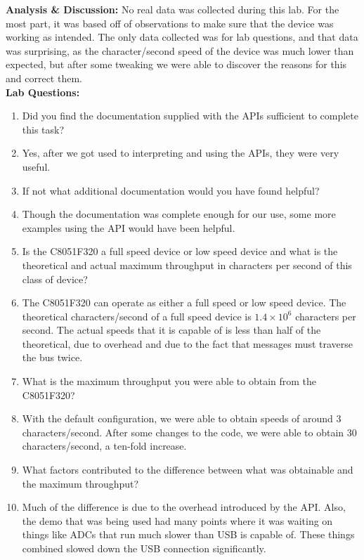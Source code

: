 \documentclass{article}
\newcommand{\Q}{\textbf{Q:}}
\newcommand{\A}{\textbf{A:}}
\newcommand{\sect}[1]{\noindent\textbf{#1}}
\begin{document}
\sect{Analysis \& Discussion:} No real data was collected during this lab. For the most part, it was based off of observations to make sure that the device was working as intended. The only data collected was for lab questions, and that data was surprising, as the character/second speed of the device was much lower than expected, but after some tweaking we were able to discover the reasons for this and correct them.\\

\sect{Lab Questions:}

\begin{enumerate}
	\item[\Q] Did you find the documentation supplied with the APIs sufficient to complete this task?
	\item[\A] Yes, after we got used to interpreting and using the APIs, they were very useful.
	\item[\Q]If not what additional documentation would you have found helpful?
	\item[\A] Though the documentation was complete enough for our use, some more examples using the API would have been helpful.
	\item[\Q] Is the C8051F320 a full speed device or low speed device and what is the theoretical and actual maximum throughput in characters per second of this class of device?
	\item[\A] The C8051F320 can operate as either a full speed or low speed device. The theoretical characters/second of a full speed device is $1.4\times 10^6$ characters per second. The actual speeds that it is capable of is less than half of the theoretical, due to overhead and due to the fact that messages must traverse the bus twice.
	\item[\Q] What is the maximum throughput you were able to obtain from the C8051F320?
	\item[\A] With the default configuration, we were able to obtain speeds of around 3 characters/second. After some changes to the code, we were able to obtain 30 characters/second, a ten-fold increase.
	\item[\Q] What factors contributed to the difference between what was obtainable and the maximum throughput?
	\item[\A] Much of the difference is due to the overhead introduced by the API. Also, the demo that was being used had many points where it was waiting on things like ADCs that run much slower than USB is capable of. These things combined slowed down the USB connection significantly.
\end{enumerate}~
\end{document}
